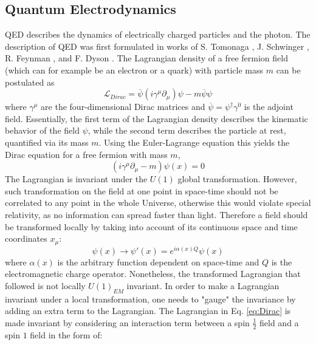 \subsection{\label{sec: QED}Quantum Electrodynamics}
\noindent QED describes the dynamics of electrically charged particles and the photon. The description of QED was first formulated in works of S. Tomonaga \cite{Tomonaga}, J. Schwinger \cite{Schwinger1, Schwinger2}, R. Feynman \cite{Feynman1,Feynman2,Feynman3}, and F. Dyson \cite{Dyson1, Dyson2}. The Lagrangian density of a free fermion field (which can for example be an electron or a quark) with particle mass $m$ can be postulated as \cite{Dirac}
\begin{equation}\label{eq:Dirac}
    \mathscr{L}_{Dirac} = \overline{\psi} (i\gamma^\mu\partial_\mu)\psi - m\overline{\psi}\psi
\end{equation}
where $\gamma^\mu$ are the four-dimensional Dirac matrices and $\overline{\psi} = \psi^\dagger\gamma^0$ is the adjoint field. Essentially, the first term of the Lagrangian density describes the kinematic behavior of the field $\psi$, while the second term describes the particle at rest, quantified via its mass $m$. Using the Euler-Lagrange equation %
this yields the Dirac equation for a free fermion with mass $m$,
\begin{equation}
    (i\gamma^\mu\partial_\mu - m)\psi(x) = 0
\end{equation}
The Lagrangian is invariant under the $U(1)$ global transformation. However, such transformation on the field at one point in space-time should not be correlated to any point in the whole Universe, otherwise this would violate special relativity, as no information can spread faster than light. Therefore a field should be transformed locally by taking into account of its continuous space and time coordinates $x_\mu$:
\begin{equation}\label{eq:transformation}
    \psi(x) \rightarrow \psi'(x) = e^{i\alpha(x)Q} \psi(x)
\end{equation}
where $\alpha(x)$ is the arbitrary function dependent on space-time and $Q$ is the electromagnetic charge operator. Nonetheless, the transformed Lagrangian that followed is not locally $U(1)_{EM}$ invariant. In order to make a Lagrangian invariant under a local transformation, one needs to "gauge" the invariance by adding an extra term to the Lagrangian. The Lagrangian in Eq. \ref{eq:Dirac} is made invariant by considering an interaction term between a spin $\frac{1}{2}$ field and a spin $1$ field in the form of:
